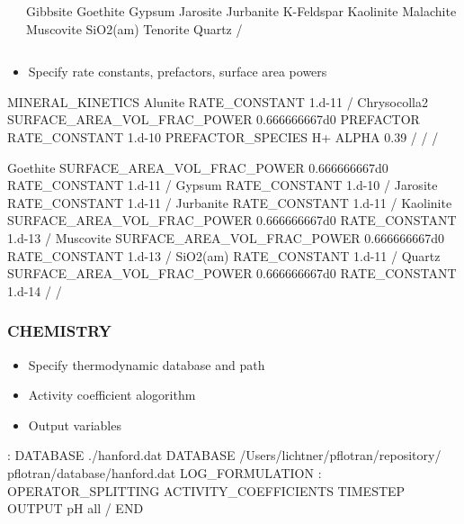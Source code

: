 \documentclass{beamer}
\begin{document}
\begin{frame}
\begin{columns}[c]
\begin{semiverbatim}
\end{semiverbatim}
\begin{semiverbatim}
    Gibbsite
    Goethite
    Gypsum
    Jarosite
    Jurbanite
    K-Feldspar
    Kaolinite
    Malachite
    Muscovite
    SiO2(am)
    Tenorite
    Quartz
  /
\end{semiverbatim}
  \end{columns}

  \newpage
  \begin{itemize}
  \item Specify rate constants, prefactors, surface area powers
  \end{itemize}
\begin{semiverbatim}
  MINERAL_KINETICS
    Alunite
      RATE_CONSTANT 1.d-11
    /
    Chrysocolla2
      SURFACE_AREA_VOL_FRAC_POWER 0.666666667d0
      PREFACTOR
        RATE_CONSTANT 1.d-10
        PREFACTOR_SPECIES H+
          ALPHA 0.39
        /
      /
    /
    
    
    Goethite
      SURFACE_AREA_VOL_FRAC_POWER 0.666666667d0
      RATE_CONSTANT 1.d-11
    /
    Gypsum
      RATE_CONSTANT 1.d-10
    /
    Jarosite
      RATE_CONSTANT 1.d-11
    /
    Jurbanite
      RATE_CONSTANT 1.d-11
    /
    Kaolinite
      SURFACE_AREA_VOL_FRAC_POWER 0.666666667d0
      RATE_CONSTANT 1.d-13
    /
    Muscovite
      SURFACE_AREA_VOL_FRAC_POWER 0.666666667d0
      RATE_CONSTANT 1.d-13
    /
    SiO2(am)
      RATE_CONSTANT 1.d-11
    /
    Quartz
      SURFACE_AREA_VOL_FRAC_POWER 0.666666667d0
      RATE_CONSTANT 1.d-14
    /
  /
\end{semiverbatim}

\end{frame}
\begin{frame}[fragile]\frametitle{\bf CHEMISTRY}

\begin{itemize}
\item Specify thermodynamic database and path
\item Activity coefficient alogorithm
\item Output variables
\end{itemize}

\begin{semiverbatim}
: DATABASE ./hanford.dat
  DATABASE /Users/lichtner/pflotran/repository/
    pflotran/database/hanford.dat
  LOG_FORMULATION
:  OPERATOR_SPLITTING
  ACTIVITY_COEFFICIENTS TIMESTEP
  OUTPUT
    pH
    all
  /
END
\end{semiverbatim}
\end{frame}
\end{document}
